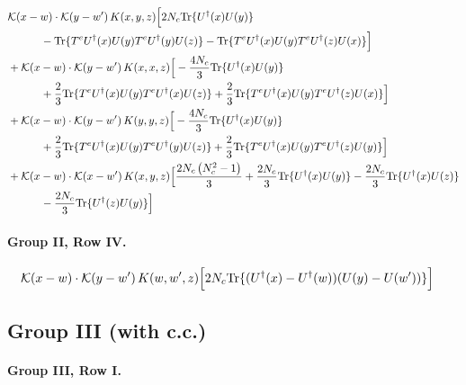 \documentclass[10pt]{article}
\numberwithin{equation}{section}
\begin{document}
\begin{align}
&\mathcal K(x-w)\cdot\mathcal K(y-w')\,K(x,y,z)\Big[2 N_c{\rm Tr}\{U^\dagger(x)U(y)\}\notag\\
&\quad\quad\quad-{\rm Tr}\{T^eU^\dagger(x)U(y)T^eU^\dagger(y)U(z)\}-{\rm Tr}\{T^eU^\dagger(x)U(y)T^eU^\dagger(z)U(x)\}\Big]\notag\\
&+\mathcal K(x-w)\cdot\mathcal K(y-w')\,K(x,x,z)\Big[-\frac{4 N_c}{3}{\rm Tr}\{U^\dagger(x)U(y)\}\notag\\
&\quad\quad\quad+\frac{2}{3}{\rm Tr}\{T^eU^\dagger(x)U(y)T^eU^\dagger(x)U(z)\}+\frac{2}{3}{\rm Tr}\{T^eU^\dagger(x)U(y)T^eU^\dagger(z)U(x)\}\Big]\notag\\
&+\mathcal K(x-w)\cdot\mathcal K(y-w')\,K(y,y,z)\Big[-\frac{4 N_c}{3}{\rm Tr}\{U^\dagger(x)U(y)\}\notag\\
&\quad\quad\quad+\frac{2}{3}{\rm Tr}\{T^eU^\dagger(x)U(y)T^eU^\dagger(y)U(z)\}+\frac{2}{3}{\rm Tr}\{T^eU^\dagger(x)U(y)T^eU^\dagger(z)U(y)\}\Big]\notag\\
&+\mathcal K(x-w)\cdot\mathcal K(x-w')\,K(x,y,z)\Big[\frac{2 N_c \left(N_c^{2} - 1\right)}{3}+\frac{2 N_c}{3}{\rm Tr}\{U^\dagger(x)U(y)\}-\frac{2 N_c}{3}{\rm Tr}\{U^\dagger(x)U(z)\}\notag\\
&\quad\quad\quad-\frac{2 N_c}{3}{\rm Tr}\{U^\dagger(z)U(y)\}\Big]
\label{eq:G2III}
\end{align}

\paragraph{Group II, Row IV.}

\begin{align}
&\mathcal K(x-w)\cdot\mathcal K(y-w')\,K(w,w',z)\Big[2 N_c{\rm Tr}\{(U^\dagger(x)-U^\dagger(w))(U(y)-U(w'))\}\Big]
\label{eq:G2IV}
\end{align}

\subsection{Group III (with c.c.)}

\paragraph{Group III, Row I.}
\end{document}
